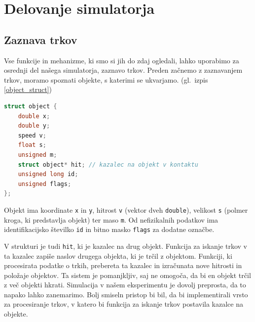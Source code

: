 \documentclass[a4paper,12pt]{article}
\begin{document}
\section{Delovanje simulatorja}
\subsection{Zaznava trkov}
Vse funkcije in mehanizme, ki smo si jih do zdaj ogledali, lahko uporabimo za osrednji del
našega simulatorja, zaznavo trkov.
Preden začnemo z zaznavanjem trkov, moramo spoznati objekte, s katerimi se ukvarjamo. (gl.\  izpis \ref{object_struct})
\begin{lstlisting}[caption={Struktura objekta}, label=object_struct, language=C]
struct object {
    double x;
    double y;
    speed v;
    float s;
    unsigned m;
    struct object* hit; // kazalec na objekt v kontaktu
    unsigned long id;
    unsigned flags;
};
\end{lstlisting}
Objekt ima koordinate \lstinline|x| in \lstinline|y|, hitrost \lstinline|v| (vektor dveh \lstinline|double|),
velikost \lstinline|s| (polmer kroga, ki predstavlja objekt) ter maso \lstinline|m|. Od nefizikalnih podatkov ima
identifikacijsko številko \lstinline|id| in bitno masko \lstinline|flags| za dodatne označbe.

V strukturi je tudi \lstinline|hit|, ki je kazalec na drug objekt. Funkcija za iskanje trkov v ta kazalec zapiše naslov
drugega objekta, ki je trčil z objektom. Funkciji, ki procesirata podatke o trkih, prebereta
ta kazalec in izračunata nove hitrosti in položaje objektov. Ta sistem je pomanjkljiv, saj ne omogoča,
da bi en objekt trčil z več objekti hkrati. Simulacija v našem eksperimentu je dovolj preprosta, da to napako
lahko zanemarimo. Bolj smiseln pristop bi bil, da bi implementirali vrsto za procesiranje trkov, v katero
bi funkcija za iskanje trkov postavila kazalce na objekte.
\end{document}
